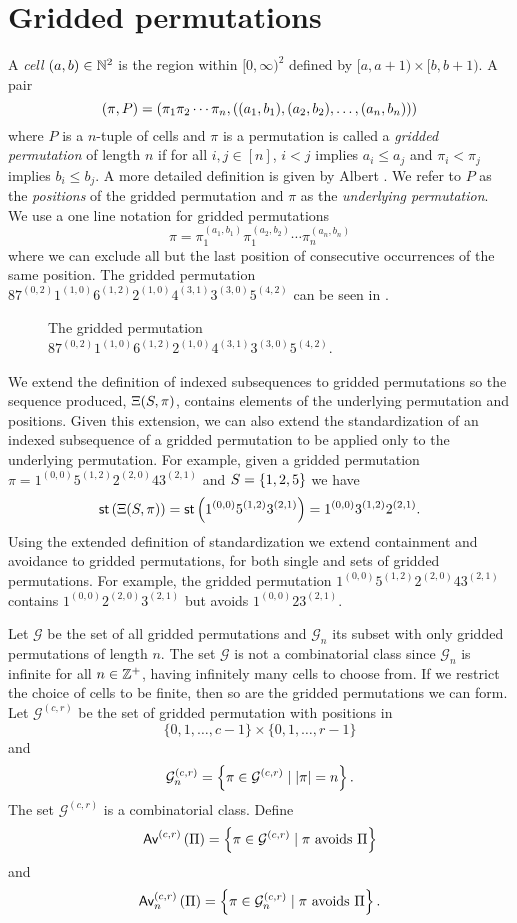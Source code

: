 \section{Gridded permutations\label{sec:griddedpermutations}}
A \emph{cell} $(a,b) \in \mathbb{N}^2$ is the region within $[0,\infty)^2$ defined by $[a, a+1) \times [b, b+1).$ A pair
\[
    (\pi,P) = (\pi_1 \pi_2 \dotsm \pi_{n}, ((a_1,b_1),(a_2,b_2),\dotsc,(a_n,b_n)))
\]
where $P$ is a $n$-tuple of cells and $\pi$ is a permutation is called a \emph{gridded permutation} of length $n$ if for all $i,j \in [n]$, $i<j$ implies $a_i \leq a_j$ and $\pi_i < \pi_j$ implies $b_i \leq b_j$. A more detailed definition is given by Albert \cite{albert2012geometric}. We refer to $P$ as the \emph{positions} of the gridded permutation and $\pi$ as the \emph{underlying permutation}. We use a one line notation for gridded permutations 
\[
    \pi = \pi_1^{(a_1,b_1)}\pi_1^{(a_2,b_2)}\dotsb\pi_n^{(a_n,b_n)}
\]
where we can exclude all but the last position of consecutive occurrences of the same position. The gridded permutation $87^{(0,2)}1^{(1,0)}6^{(1,2)}2^{(1,0)}4^{(3,1)}3^{(3,0)}5^{(4,2)}$ can be seen in .

\begin{figure}[ht!]
    \centering
    
    \caption{The gridded permutation $87^{(0,2)}1^{(1,0)}6^{(1,2)}2^{(1,0)}4^{(3,1)}3^{(3,0)}5^{(4,2)}$.}
    \label{fig:gridded_perm}
\end{figure}

We extend the definition of indexed subsequences to gridded permutations so the sequence produced, $\Xi(S,\pi)$, contains elements of the underlying permutation and positions. Given this extension, we can also extend the standardization of an indexed subsequence of a gridded permutation to be applied only to the underlying permutation. For example, given a gridded permutation $\pi = 1^{(0,0)}5^{(1,2)}2^{(2,0)}43^{(2,1)}$ and $S=\left\{1,2,5\right\}$ we have
\[
\textsf{st}\left(\Xi(S,\pi)\right) = \textsf{st}\left(1^{(0,0)}5^{(1,2)}3^{(2,1)}\right) = 1^{(0,0)}3^{(1,2)}2^{(2,1)}.
\]
Using the extended definition of standardization we extend containment and avoidance to gridded permutations, for both single and sets of gridded permutations. For example, the gridded permutation $1^{(0,0)}5^{(1,2)}2^{(2,0)}43^{(2,1)}$ contains $1^{(0,0)}2^{(2,0)}3^{(2,1)}$ but avoids $1^{(0,0)}23^{(2,1)}$.

Let $\mathcal{G}$ be the set of all gridded permutations and $\mathcal{G}_n$ its subset with only gridded permutations of length $n$. The set $\mathcal{G}$ is not a combinatorial class since $\mathcal{G}_n$ is infinite for all $n \in \mathbb{Z}^+$, having infinitely many cells to choose from. If we restrict the choice of cells to be finite, then so are the gridded permutations we can form. Let $\mathcal{G}^{(c,r)}$ be the set of gridded permutation with positions in 
\[
\{0,1,\dotsc,c-1\} \times \{0,1,\dotsc,r-1\}
\]
and
\[
\mathcal{G}^{(c,r)}_n = \left\{\pi \in \mathcal{G}^{(c,r)} \mid |\pi| = n\right\}.
\]
The set $\mathcal{G}^{(c,r)}$ is a combinatorial class. Define
\[
    \textsf{Av}^{(c,r)}\left(\Pi\right) = \left\{\pi \in \mathcal{G}^{(c,r)} \mid \pi \text{ avoids } \Pi\right\}
\]
and
\[
    \textsf{Av}_n^{(c,r)}\left(\Pi\right) = \left\{\pi \in \mathcal{G}_n^{(c,r)} \mid \pi \text{ avoids } \Pi\right\}.
\]

